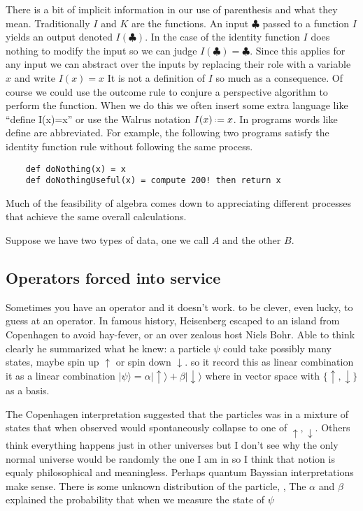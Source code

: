 There is a bit of implicit information in our use 
of parenthesis and what they mean.  Traditionally $I$ and $K$ are 
the functions.  An input $\clubsuit$ passed to a function $I$ 
yields an output denoted $I(\clubsuit)$.  In the case of the identity 
function $I$ does nothing to modify the input so we can judge 
$I(\clubsuit)=\clubsuit$.  Since this applies for any input we 
can abstract over the inputs by replacing their role with a variable 
$x$ and write $I(x)=x$  It is not a definition of $I$ so much as 
a consequence.  Of course we could use the outcome rule to conjure 
a perspective algorithm to perform the function.  When we do this 
we often insert some extra language like ``define I(x)=x'' or 
use the Walrus notation $I(x)\defeq x$.  In programs words like 
define are abbreviated.  For example, the following two programs satisfy
the identity function rule without following the same process.
\begin{lstlisting}
    def doNothing(x) = x 
    def doNothingUseful(x) = compute 200! then return x
\end{lstlisting}
Much of the feasibility of algebra comes down to appreciating 
different processes that achieve the same overall calculations.


Suppose we have two types of data, one we call $A$ and the other $B$.



\subsection{Operators forced into service}
Sometimes you have an operator and it doesn't work.
to be clever, even lucky, to guess at an operator.
In famous history, Heisenberg escaped to an island from Copenhagen 
to avoid hay-fever, or an over zealous host Niels Bohr. 
Able to think clearly he summarized what he knew: a particle $\psi$
could take possibly many states, maybe spin up $\uparrow$ or spin down 
$\downarrow$.  so it record this as linear combination
it as a linear combination $|\psi\rangle = \alpha|\uparrow\rangle+\beta|\downarrow\rangle$
where in vector space with $\{\uparrow,\downarrow\}$ as a basis. 


The Copenhagen interpretation suggested that the particles 
was in a mixture of states that when observed would spontaneously collapse 
to one of $\uparrow,\downarrow$.  Others think everything happens just in 
other universes but I don't see why the only normal universe would be 
randomly the one I am in so I think that notion is equaly philosophical and 
meaningless.  Perhaps quantum Bayssian interpretations make sense.  There is 
some unknown distribution of the particle, , 
The $\alpha$ and $\beta$ explained the probability that when we 
measure the state of $\psi$ 

